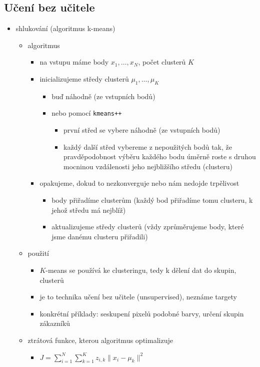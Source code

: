 \subsection{Učení bez učitele}
\begin{itemize}
\item shlukování (algoritmus k-means)
\begin{itemize}
\item algoritmus
\begin{itemize}
\item na vstupu máme body $x_1,\dots,x_N$, počet clusterů $K$
\item inicializujeme středy clusterů $\mu_1,\dots,\mu_K$
\begin{itemize}
\item buď náhodně (ze vstupních bodů)
\item nebo pomocí \texttt{kmeans++}
\begin{itemize}
\item první střed se vybere náhodně (ze vstupních bodů)
\item každý další střed vybereme z nepoužitých bodů tak, že pravděpodobnost výběru každého bodu úměrně roste s druhou mocninou vzdálenosti jeho nejbližšího středu (clusteru)
\end{itemize}
\end{itemize}
\item opakujeme, dokud to nezkonverguje nebo nám nedojde trpělivost
\begin{itemize}
\item body přiřadíme clusterům (každý bod přiřadíme tomu clusteru, k jehož středu má nejblíž)
\item aktualizujeme středy clusterů (vždy zprůměrujeme body, které jsme danému clusteru přiřadili)
\end{itemize}
\end{itemize}
\item použití
\begin{itemize}
\item $K$-means se používá ke clusteringu, tedy k dělení dat do skupin, clusterů
\item je to technika učení bez učitele (unsupervised), neznáme targety
\item konkrétní příklady: seskupení pixelů podobné barvy, určení skupin zákazníků
\end{itemize}
\item ztrátová funkce, kterou algoritmus optimalizuje
\begin{itemize}
\item $J=\sum_{i=1}^N\sum_{k=1}^Kz_{i,k}\|x_i-\mu_k\|^2$

\end{itemize}
\end{itemize}
\end{itemize}
